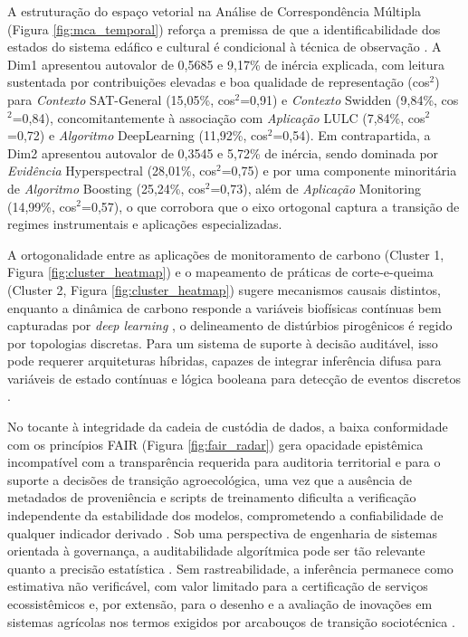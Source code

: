 \documentclass[lineno,pdflatex,sn-apa]{sn-jnl}%
\begin{document}
A estruturação do espaço vetorial na Análise de Correspondência Múltipla (Figura \ref{fig:mca_temporal}) reforça a premissa de que a identificabilidade dos estados do sistema edáfico e cultural é condicional à técnica de observação \citep{Reichstein2019}. A Dim1 apresentou autovalor de 0,5685 e 9,17\% de inércia explicada, com leitura sustentada por contribuições elevadas e boa qualidade de representação (cos$^2$) para \textit{Contexto} SAT-General (15,05\%, cos$^2$=0,91) e \textit{Contexto} Swidden (9,84\%, cos$^2$=0,84), concomitantemente à associação com \textit{Aplicação} LULC (7,84\%, cos$^2$=0,72) e \textit{Algoritmo} DeepLearning (11,92\%, cos$^2$=0,54). Em contrapartida, a Dim2 apresentou autovalor de 0,3545 e 5,72\% de inércia, sendo dominada por \textit{Evidência} Hyperspectral (28,01\%, cos$^2$=0,75) e por uma componente minoritária de \textit{Algoritmo} Boosting (25,24\%, cos$^2$=0,73), além de \textit{Aplicação} Monitoring (14,99\%, cos$^2$=0,57), o que corrobora que o eixo ortogonal captura a transição de regimes instrumentais e aplicações especializadas.

A ortogonalidade entre as aplicações de monitoramento de carbono (Cluster 1, Figura \ref{fig:cluster_heatmap}) e o mapeamento de práticas de corte-e-queima (Cluster 2, Figura \ref{fig:cluster_heatmap}) sugere mecanismos causais distintos, enquanto a dinâmica de carbono responde a variáveis biofísicas contínuas bem capturadas por \textit{deep learning} \citep{Celette2016WaterStress}, o delineamento de distúrbios pirogênicos é regido por topologias discretas. Para um sistema de suporte à decisão auditável, isso pode requerer arquiteturas híbridas, capazes de integrar inferência difusa para variáveis de estado contínuas e lógica booleana para detecção de eventos discretos \citep{Akram2026}.

No tocante à integridade da cadeia de custódia de dados, a baixa conformidade com os princípios FAIR (Figura \ref{fig:fair_radar}) gera opacidade epistêmica incompatível com a transparência requerida para auditoria territorial e para o suporte a decisões de transição agroecológica, uma vez que a ausência de metadados de proveniência e scripts de treinamento dificulta a verificação independente da estabilidade dos modelos, comprometendo a confiabilidade de qualquer indicador derivado \citep{Tuia2021,Samuel2021,Ivie2018,Zheng2024}. Sob uma perspectiva de engenharia de sistemas orientada à governança, a auditabilidade algorítmica pode ser tão relevante quanto a precisão estatística \citep{Rudin2019}. Sem rastreabilidade, a inferência permanece como estimativa não verificável, com valor limitado para a certificação de serviços ecossistêmicos e, por extensão, para o desenho e a avaliação de inovações em sistemas agrícolas nos termos exigidos por arcabouços de transição sociotécnica \citep{Tuia2021}.
\end{document}
